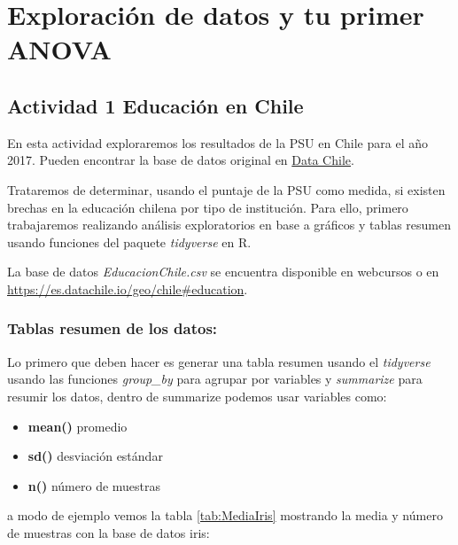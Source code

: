 \documentclass[]{book}
\newenvironment{Shaded}{\begin{snugshade}}{\end{snugshade}}
\newcommand{\DataTypeTok}[1]{\textcolor[rgb]{0.13,0.29,0.53}{#1}}
\newcommand{\KeywordTok}[1]{\textcolor[rgb]{0.13,0.29,0.53}{\textbf{#1}}}
\newcommand{\NormalTok}[1]{#1}
\newcommand{\OperatorTok}[1]{\textcolor[rgb]{0.81,0.36,0.00}{\textbf{#1}}}
\newcommand{\StringTok}[1]{\textcolor[rgb]{0.31,0.60,0.02}{#1}}
\providecommand{\tightlist}{%
  \setlength{\itemsep}{0pt}\setlength{\parskip}{0pt}}
\begin{document}
\hypertarget{Explorando}{%
\chapter{Exploración de datos y tu primer ANOVA}\label{Explorando}}

\hypertarget{actividad-1-educacion-en-chile}{%
\section{Actividad 1 Educación en Chile}\label{actividad-1-educacion-en-chile}}

En esta actividad exploraremos los resultados de la PSU en Chile para el año 2017. Pueden encontrar la base de datos original en \href{https://es.datachile.io/geo/chile\#education}{Data Chile}.

Trataremos de determinar, usando el puntaje de la PSU como medida, si existen brechas en la educación chilena por tipo de institución. Para ello, primero trabajaremos realizando análisis exploratorios en base a gráficos y tablas resumen usando funciones del paquete \emph{tidyverse} \citep{WickhamTidy2017} en R.

La base de datos \emph{EducacionChile.csv} se encuentra disponible en webcursos o en \url{https://es.datachile.io/geo/chile\#education}.

\hypertarget{tablas-resumen-de-los-datos}{%
\subsection{Tablas resumen de los datos:}\label{tablas-resumen-de-los-datos}}

Lo primero que deben hacer es generar una tabla resumen usando el \emph{tidyverse} usando las funciones \emph{group\_by} para agrupar por variables y \emph{summarize} para resumir los datos, dentro de summarize podemos usar variables como:

\begin{itemize}
\tightlist
\item
  \textbf{mean()} promedio
\item
  \textbf{sd()} desviación estándar
\item
  \textbf{n()} número de muestras
\end{itemize}

a modo de ejemplo vemos la tabla \ref{tab:MediaIris} mostrando la media y número de muestras con la base de datos iris:

\begin{Shaded}
\end{Shaded}
\end{document}
